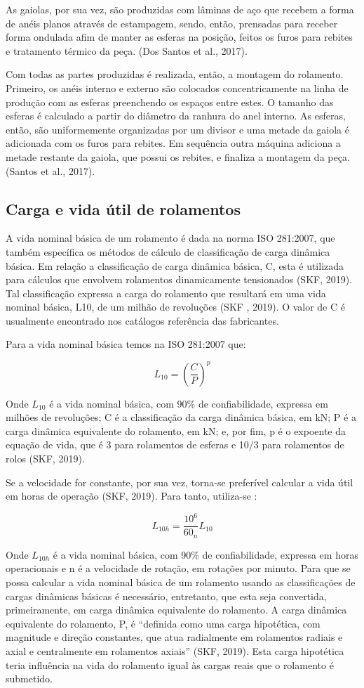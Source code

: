 \documentclass[
	12pt,				
	oneside,			
	a4paper,			
	english,			
	brazil				
	]{abntex2ppgsi}
\begin{document}
As gaiolas, por sua vez, são produzidas com lâminas de aço que recebem a forma de anéis planos através de estampagem, sendo, então, prensadas para receber forma ondulada afim de manter as esferas na posição, feitos os furos para rebites e tratamento térmico da peça. (Dos Santos et al., 2017).
 
Com todas as partes produzidas é realizada, então, a montagem do rolamento. Primeiro, os anéis interno e externo são colocados concentricamente na linha de produção com as esferas preenchendo os espaços entre estes. O tamanho das esferas é calculado a partir do diâmetro da ranhura do anel interno. As esferas, então, são uniformemente organizadas por um divisor e uma metade da gaiola é adicionada com os furos para rebites. Em sequência outra máquina adiciona a metade restante da gaiola, que possui os rebites, e finaliza a montagem da peça. (Santos et al., 2017). 


\subsection{\textbf{Carga e vida útil de rolamentos}}

A vida nominal básica de um rolamento é dada na norma ISO 281:2007, que também específica os métodos de cálculo de classificação de carga dinâmica básica. Em relação a classificação de carga dinâmica básica, C, esta é utilizada para cálculos que envolvem rolamentos dinamicamente tensionados (SKF, 2019). Tal classificação expressa a carga do rolamento que resultará em uma vida nominal básica, L10, de um milhão de revoluções (SKF , 2019). O valor de C é usualmente encontrado nos catálogos referência das fabricantes.   

Para a vida nominal básica temos na ISO 281:2007 que:

\[L_{10}= \left ( \frac{C}{P} \right )^{p}  \]

Onde $L_{10}$ é a vida nominal básica, com 90\% de confiabilidade, expressa em milhões de revoluções; C é a classificação da carga dinâmica básica, em kN; P é a carga dinâmica equivalente do rolamento, em kN; e, por fim, p é o expoente da equação de vida, que é 3 para rolamentos de esferas e 10/3 para rolamentos de rolos (SKF, 2019).

Se a velocidade for constante, por sua vez, torna-se preferível calcular a vida útil em horas de operação (SKF, 2019). Para tanto, utiliza-se :

\[L_{10h}= \frac{10^{6}}{60_{n}}L_{10}\]

Onde $L_{10h}$ é a vida nominal básica, com 90\% de confiabilidade, expressa em horas operacionais e n é a velocidade de rotação, em rotações por minuto. 
Para que se possa calcular a vida nominal básica de um rolamento usando as classificações de cargas dinâmicas básicas é necessário, entretanto, que esta seja convertida, primeiramente, em carga dinâmica equivalente do rolamento. A carga dinâmica equivalente do rolamento, P, é “definida como uma carga hipotética, com magnitude e direção constantes, que atua radialmente em rolamentos radiais e axial e centralmente em rolamentos axiais” (SKF, 2019). Esta carga hipotética teria influência na vida do rolamento igual às cargas reais que o rolamento é submetido.
\end{document}
